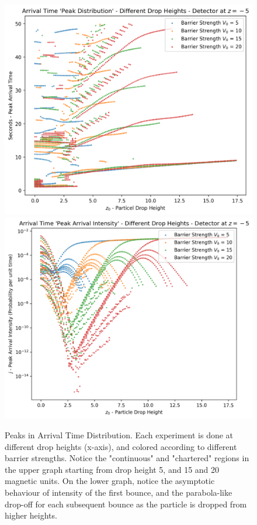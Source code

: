 \begin{figure}
    \centering
    \includegraphics[width=1\linewidth]{Figures//Yoshida/c8e61b3f-c0e7-42e2-9757-332081859752.png}
    \includegraphics[width=1\linewidth]{Figures//Yoshida/eb253fe9-8277-4b3a-ab94-bbfb6369647d.png}
    \caption{Peaks in Arrival Time Distribution. Each experiment is done at different drop heights (x-axis), and colored according to different barrier strengths. Notice the "continuous" and "chartered" regions in the upper graph starting from drop height 5, and 15 and 20 magnetic units. On the lower graph, notice the asymptotic behaviour of intensity of the first bounce, and the parabola-like drop-off for each subsequent bounce as the particle is dropped from higher heights.}
    \label{fig:particle_drop_height_power}
\end{figure}

